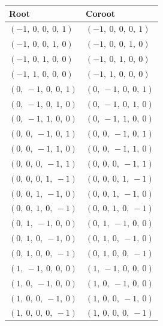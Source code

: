 \documentclass[11pt]{article}
\theoremstyle{definition}
\begin{document}
\noindent \begin{tabular}{|l|l|}
    \hline
    \textbf{Root} & \textbf{Coroot} \\
    \hline
    $\left( -1, \  0, \  0, \  0, \  1\right)$ & $\left( -1, \  0, \  0, \  0, \  1\right)$ \\
    \hline
    $\left( -1, \  0, \  0, \  1, \  0\right)$ & $\left( -1, \  0, \  0, \  1, \  0\right)$ \\
    \hline
    $\left( -1, \  0, \  1, \  0, \  0\right)$ & $\left( -1, \  0, \  1, \  0, \  0\right)$ \\
    \hline
    $\left( -1, \  1, \  0, \  0, \  0\right)$ & $\left( -1, \  1, \  0, \  0, \  0\right)$ \\
    \hline
    $\left( 0, \  -1, \  0, \  0, \  1\right)$ & $\left( 0, \  -1, \  0, \  0, \  1\right)$ \\
    \hline
    $\left( 0, \  -1, \  0, \  1, \  0\right)$ & $\left( 0, \  -1, \  0, \  1, \  0\right)$ \\
    \hline
    $\left( 0, \  -1, \  1, \  0, \  0\right)$ & $\left( 0, \  -1, \  1, \  0, \  0\right)$ \\
    \hline
    $\left( 0, \  0, \  -1, \  0, \  1\right)$ & $\left( 0, \  0, \  -1, \  0, \  1\right)$ \\
    \hline
    $\left( 0, \  0, \  -1, \  1, \  0\right)$ & $\left( 0, \  0, \  -1, \  1, \  0\right)$ \\
    \hline
    $\left( 0, \  0, \  0, \  -1, \  1\right)$ & $\left( 0, \  0, \  0, \  -1, \  1\right)$ \\
    \hline
    $\left( 0, \  0, \  0, \  1, \  -1\right)$ & $\left( 0, \  0, \  0, \  1, \  -1\right)$ \\
    \hline
    $\left( 0, \  0, \  1, \  -1, \  0\right)$ & $\left( 0, \  0, \  1, \  -1, \  0\right)$ \\
    \hline
    $\left( 0, \  0, \  1, \  0, \  -1\right)$ & $\left( 0, \  0, \  1, \  0, \  -1\right)$ \\
    \hline
    $\left( 0, \  1, \  -1, \  0, \  0\right)$ & $\left( 0, \  1, \  -1, \  0, \  0\right)$ \\
    \hline
    $\left( 0, \  1, \  0, \  -1, \  0\right)$ & $\left( 0, \  1, \  0, \  -1, \  0\right)$ \\
    \hline
    $\left( 0, \  1, \  0, \  0, \  -1\right)$ & $\left( 0, \  1, \  0, \  0, \  -1\right)$ \\
    \hline
    $\left( 1, \  -1, \  0, \  0, \  0\right)$ & $\left( 1, \  -1, \  0, \  0, \  0\right)$ \\
    \hline
    $\left( 1, \  0, \  -1, \  0, \  0\right)$ & $\left( 1, \  0, \  -1, \  0, \  0\right)$ \\
    \hline
    $\left( 1, \  0, \  0, \  -1, \  0\right)$ & $\left( 1, \  0, \  0, \  -1, \  0\right)$ \\
    \hline
    $\left( 1, \  0, \  0, \  0, \  -1\right)$ & $\left( 1, \  0, \  0, \  0, \  -1\right)$ \\
    \hline
\end{tabular}
\end{document}
